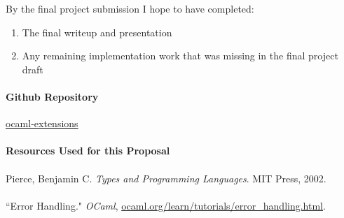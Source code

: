 \documentclass{article}
\begin{document}
\noindent
By the final project submission I hope to have completed:
\begin{enumerate}
\item The final writeup and presentation
\item Any remaining implementation work that was missing in the final project
  draft
\end{enumerate}

\paragraph{Github Repository}

\href{https://github.com/lstuntz/ocaml-exceptions}{ocaml-extensions}

\paragraph{Resources Used for this Proposal}
\paragraph{}
Pierce, Benjamin C. \emph{Types and Programming Languages}. MIT Press, 2002.
\paragraph{}
``Error Handling." \emph{OCaml}, \href{https://ocaml.org/learn/tutorials/error_handling.html}{ocaml.org/learn/tutorials/error\_handling.html}.
\end{document}
